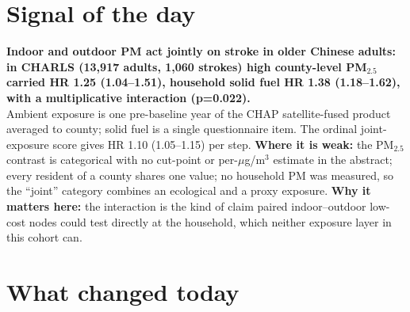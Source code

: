 \documentclass[10pt]{article}
\begin{document}
\vspace{6mm}

\section*{\sffamily\bfseries\color{Deep}Signal of the day}
\vspace{-1.5mm}{\color{Amber}\rule{\linewidth}{1.1pt}}\vspace{2.5mm}

\begin{keybox}
{\sffamily\bfseries\small\color{Deep}Indoor and outdoor PM act jointly on stroke in older Chinese adults: in CHARLS (13,917 adults, 1,060 strokes) high county-level PM$_{2.5}$ carried HR 1.25 (1.04--1.51), household solid fuel HR 1.38 (1.18--1.62), with a multiplicative interaction (p=0.022).}\\[1.4mm]
\footnotesize
Ambient exposure is one pre-baseline year of the CHAP satellite-fused product averaged to county; solid fuel is a single questionnaire item. The ordinal joint-exposure score gives HR 1.10 (1.05--1.15) per step.
\textbf{Where it is weak:} the PM$_{2.5}$ contrast is categorical with no cut-point or per-$\mu$g/m$^3$ estimate in the abstract; every resident of a county shares one value; no household PM was measured, so the ``joint'' category combines an ecological and a proxy exposure.
\textbf{Why it matters here:} the interaction is the kind of claim paired indoor--outdoor low-cost nodes could test directly at the household, which neither exposure layer in this cohort can.\par
\end{keybox}

\vspace{3mm}

\section*{\sffamily\bfseries\color{Deep}What changed today}
\vspace{-1.5mm}{\color{Amber}\rule{\linewidth}{1.1pt}}\vspace{2.5mm}
\end{document}
